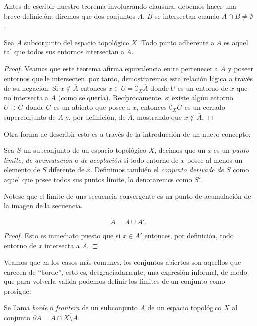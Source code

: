 \documentclass[11pt,oneside,a4paper]{book}
\begin{document}
Antes de escribir nuestro teorema involucrando clausura, debemos hacer una breve definición: diremos que dos conjuntos $A$, $B$ se intersectan cuando $A\cap B\neq\emptyset$.
\begin{thm}
Sea $A$ subconjunto del espacio topológico $X$. Todo punto adherente a $A$ es aquel tal que todos sus entornos intersectan a $A$.
\end{thm}
\begin{proof}
Veamos que este teorema afirma equivalencia entre pertenecer a $\overline{A}$ y poseer entornos que le intersecten, por tanto, demostraremos esta relación lógica a través de su negación. Si $x\notin\overline{A}$ entonces $x\in U=\complement_X\overline{A}$ donde $U$ es un entorno de $x$ que no intersecta a $A$ (como se quería). Recíprocamente, si existe algún entorno $U\supset G$ donde $G$ es un abierto que posee a $x$, entonces $\complement_X G$ es un cerrado superconjunto de $A$ y, por definición, de $\overline{A}$, mostrando que $x\notin \overline{A}$.
\end{proof}
Otra forma de describir esto es a través de la introducción de un nuevo concepto:
\begin{mydef}
Sea $S$ un subconjunto de un espacio topológico $X$, decimos que un $x$ es un \textit{punto límite}, \textit{de acumulación} o \textit{de acoplación} si todo entorno de $x$ posee al menos un elemento de $S$ diferente de $x$. Definimos también el \textit{conjunto derivado de $S$} como aquel que posee todos sus puntos límite, lo denotaremos como $S'$.
\end{mydef}
Nótese que el límite de una secuencia convergente es un punto de acumulación de la imagen de la secuencia.
\begin{thm}
$$\overline{A}=A\cup A'.$$
\end{thm}
\begin{proof}
Esto es inmediato puesto que si $x\in A'$ entonces, por definición, todo entorno de $x$ intersecta a $A$.
\end{proof}
Veamos que en los casos más comunes, los conjuntos abiertos son aquellos que carecen de ``borde'', esto es, desgraciadamente, una expresión informal, de modo que para volverla valida podemos definir los límites de un conjunto como prosigue:
\begin{mydef}[Frontera]
Se llama \textit{borde} o \textit{frontera} de un subconjunto $A$ de un espacio topológico $X$ al conjunto $\partial A=\overline{A}\cap\overline{X\setminus A}$.
\end{mydef}
\end{document}
